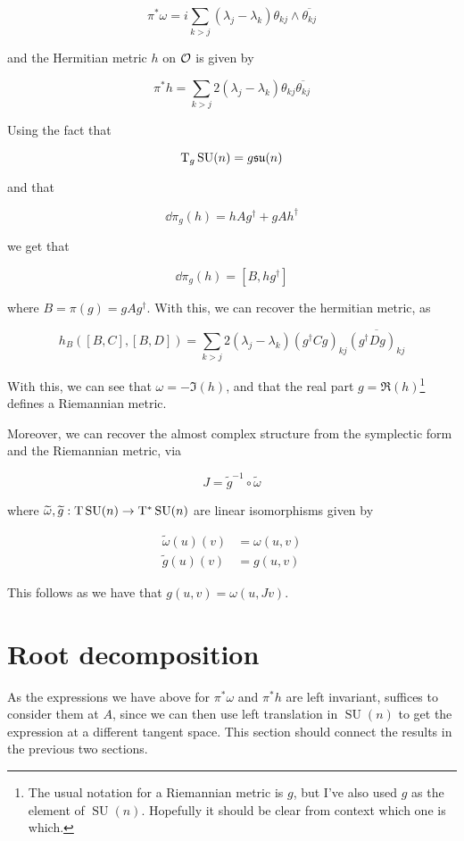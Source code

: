 \documentclass{article}
\DeclareMathOperator{\SU}{SU}
\newcommand{\su}{\mathfrak{su}}
\renewcommand{\tilde}{\widetilde}
\begin{document}
\[\pi^*\omega = i \sum_{k > j}(\lambda_j - \lambda_k)\theta_{kj}\wedge \overline{\theta_{kj}}\]

and the Hermitian metric \(h\) on \(\mathcal{O}\) is given by

\[\pi^*h = \sum_{k > j}2(\lambda_j - \lambda_k)\theta_{kj}\overline{\theta_{kj}}\]

Using the fact that

\[\TT_g\SU(n) = g\su(n)\]

and that

\[\dd\pi_g(h) = hAg^\dagger + gAh^\dagger\]

we get that

\[\dd\pi_g(h) = [B, hg^\dagger]\]

where \(B = \pi(g) = gAg^\dagger\). With this, we can recover the hermitian metric, as

\[h_B([B, C], [B, D]) = \sum_{k > j}2(\lambda_j - \lambda_k)(g^\dagger Cg)_{kj}\overline{(g^\dagger Dg)_{kj}}\]

With this, we can see that \(\omega = -\Im(h)\), and that the real part \(g = \Re(h)\)\footnote{The usual notation for a Riemannian metric is \(g\), but I've also used \(g\) as the element of \(\SU(n)\). Hopefully it should be clear from context which one is which.} defines a Riemannian metric.

Moreover, we can recover the almost complex structure from the symplectic form and the Riemannian metric, via

\[J = \tilde g^{-1} \circ \tilde\omega\]

where \(\tilde\omega, \tilde g : \TT \SU(n) \to \TT^*\SU(n)\) are linear isomorphisms given by

\begin{align*}
    \tilde \omega(u)(v) &= \omega(u, v) \\
    \tilde g(u)(v) &= g(u, v)
\end{align*}

This follows as we have that \(g(u, v) = \omega(u, Jv)\).

\section{Root decomposition}

As the expressions we have above for \(\pi^*\omega\) and \(\pi^*h\) are left invariant, suffices to consider them at \(A\), since we can then use left translation in \(\SU(n)\) to get the expression at a different tangent space. This section should connect the results in the previous two sections.
\end{document}
